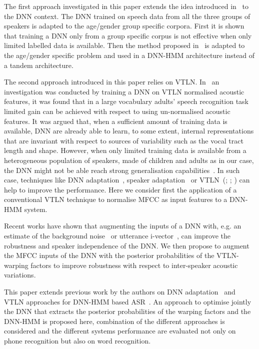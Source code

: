 \documentclass{nle}
\begin{document}
The  first  approach  investigated   in  this  paper  extends  the  idea
introduced in~\citet{YocMor92} to the  DNN context.  The DNN trained on
speech data  from all the three  groups of speakers is  adapted to the
age/gender group specific corpora.  First  it is shown that training a
DNN  only from  a group  specific corpus  is not  effective  when only
limited  labelled  data  is   available.   Then  the  method  proposed
in~\citet{thomas13} is  adapted to the age/gender  specific problem and
used in a DNN-HMM architecture instead of a tandem architecture.

The second approach introduced in this paper relies on VTLN. 
In~\citet{seide11} an  investigation was conducted  by training a
DNN on VTLN normalised acoustic features, it was found that in a large
vocabulary  adults'  speech  recognition  task  limited  gain  can  be
achieved with respect to using un-normalised acoustic features.  It was
argued that, when  a sufficient amount of training  data is available,
DNN   are  already   able  to   learn,  to   some   extent,  internal
representations  that  are  invariant   with  respect  to  sources  of
variability such as  the vocal tract length and  shape.  However, when
only  limited  training  data   is  available  from  a  heterogeneous
population of speakers,  made of children and adults  as in our case,
the   DNN   might   not    be   able   reach   strong   generalisation
capabilities~\citep*{SerGiu2014}.   In such  case,  techniques like  DNN
adaptation~\citep{vietbac10,swietojanski12,thomas13}, speaker
adaptation~\citep*{abdel2013rapid,liao2013speaker} or
VTLN~(\citealp*{EidGis96}; \citealp{LeeRos96}; \citealp*{WegMcaOrlPek96})  can help to  improve the
performance. Here we consider  first the application of a conventional
VTLN technique to normalise MFCC as input features to a DNN-HMM system.

Recent  works have shown  that augmenting  the inputs  of a  DNN with,
e.g.  an  estimate  of  the background  noise~\citep*{export:194344}  or
utterance  i-vector~\citep*{42536},  can   improve  the  robustness  and
speaker independence of  the DNN. We then propose  to augment the MFCC
inputs of the DNN with the posterior probabilities of the VTLN-warping
factors to  improve robustness with respect  to inter-speaker acoustic
variations.

This   paper  extends   previous  work   by  the   authors   on  DNN
adaptation~\citep{SerGiu2014}      and      VTLN     approaches      for
DNN-HMM based ASR~\citep*{SerGiu2014a}.  An approach to  optimise jointly  the DNN
that extracts the posterior probabilities of  the warping factors and the DNN-HMM is
proposed here,  combination of the different  approaches is considered
and the different systems performance  are evaluated not only on phone
recognition but also on word recognition.
\end{document}
